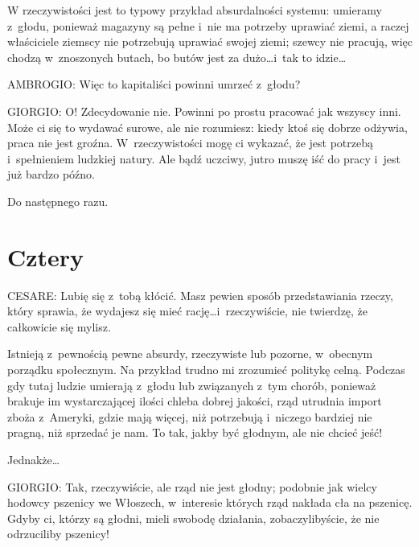 \documentclass[oneside,polish,11pt,sfheadings]{mwbk}
\begin{document}
 
W rzeczywistości jest to typowy przykład absurdalności systemu: umieramy z~głodu, ponieważ magazyny są pełne i~nie ma
potrzeby uprawiać ziemi, a raczej właściciele ziemscy nie potrzebują uprawiać swojej ziemi; szewcy nie pracują, więc
chodzą w~znoszonych butach, bo butów jest za dużo\ldots i~tak to idzie\ldots 




 
\noindent AMBROGIO: Więc to kapitaliści powinni umrzeć z~głodu? 




 
\noindent GIORGIO: O! Zdecydowanie nie. Powinni po prostu pracować jak wszyscy inni. Może ci się to wydawać surowe, ale nie
rozumiesz: kiedy ktoś się dobrze odżywia, praca nie jest groźna. W~rzeczywistości mogę ci wykazać, że jest potrzebą i~spełnieniem ludzkiej natury. Ale bądź uczciwy, jutro muszę iść do pracy i~jest już bardzo późno. 

 
Do następnego razu. 










\chapter*{Cztery}



 
\noindent CESARE: Lubię się z~tobą kłócić. Masz pewien sposób przedstawiania rzeczy, który sprawia, że  wydajesz się
mieć rację\ldots i~rzeczywiście, nie twierdzę, że całkowicie się mylisz. 

 
Istnieją z~pewnością pewne absurdy, rzeczywiste lub pozorne, w~obecnym porządku społecznym. Na przykład trudno mi
zrozumieć politykę celną. Podczas gdy tutaj ludzie umierają z~głodu lub związanych z~tym chorób, ponieważ brakuje im
wystarczającej ilości chleba dobrej jakości, rząd utrudnia import zboża z~Ameryki, gdzie mają więcej, niż potrzebują i~niczego bardziej nie pragną, niż sprzedać je nam. To tak, jakby być głodnym, ale nie chcieć jeść! 

 
Jednakże\ldots 




 
\noindent GIORGIO: Tak, rzeczywiście, ale rząd nie jest głodny; podobnie jak wielcy hodowcy pszenicy we Włoszech, w~interesie
których rząd nakłada cła na pszenicę. Gdyby ci, którzy są głodni, mieli swobodę działania, zobaczylibyście, że nie
odrzuciliby pszenicy! 
\end{document}
